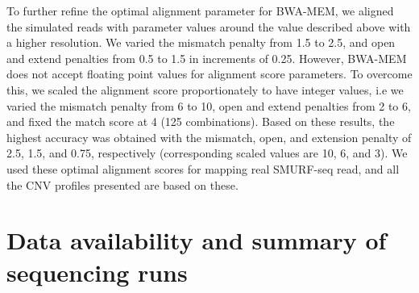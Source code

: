 To further refine the optimal alignment parameter for BWA-MEM, we
aligned the simulated reads with parameter values around the value
described above with a higher resolution. We varied the mismatch penalty
from 1.5 to 2.5, and open and extend penalties from 0.5 to 1.5 in
increments of 0.25.
%
However, BWA-MEM does not accept floating point values for alignment
score parameters. To overcome this, we scaled the alignment score
proportionately to have integer values, i.e we varied the mismatch
penalty from 6 to 10, open and extend penalties from 2 to 6, and fixed
the match score at 4 (125 combinations).
%
Based on these results, the highest accuracy was obtained with the
mismatch, open, and extension penalty of 2.5, 1.5, and 0.75,
respectively (corresponding scaled values are 10, 6, and 3). We used
these optimal alignment scores for mapping real SMURF-seq read, and all
the CNV profiles presented are based on these.



\chapter{Data availability and summary of sequencing runs}
\label{appendC}

